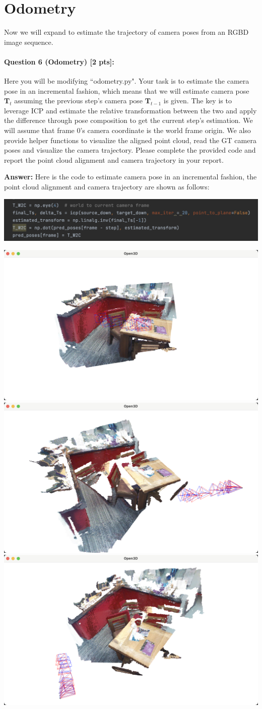 \documentclass[11pt]{article}
\begin{document}
\section*{Odometry} 
Now we will expand to estimate the trajectory of camera poses from an RGBD image sequence.

\paragraph{Question 6 (Odometry) [2 pts]:}
Here you will be modifying ``odometry.py". Your task is to estimate the camera pose in an incremental fashion, which means that we will estimate camera pose $\mathbf{T}_t$ assuming the previous step's camera pose $\mathbf{T}_{t-1}$ is given. The key is to leverage ICP and estimate the relative transformation between the two and apply the difference through pose composition to get the current step's estimation. We will assume that frame 0's camera coordinate is the world frame origin. We also provide helper functions to visualize the aligned point cloud, read the GT camera poses and visualize the camera trajectory. Please complete the provided code and report the point cloud alignment and camera trajectory in your report. 

\textbf{Answer: }Here is the code to estimate camera pose in an incremental fashion, the point cloud alignment and camera trajectory are shown as follows:
\begin{center}
    \small
    \includegraphics[width=0.3\linewidth]{fig/Q6code.png}
\end{center}
\begin{center}
    \small
    \includegraphics[width=0.3\linewidth]{fig/Q6output1.png}
    \includegraphics[width=0.3\linewidth]{fig/Q6output2.png}
    \includegraphics[width=0.3\linewidth]{fig/Q6output3.png}
\end{center}
\end{document}
